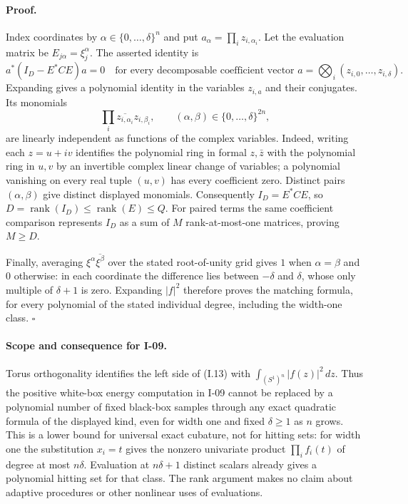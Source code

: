 \documentclass[11pt,a4paper]{article}
\theoremstyle{definition}\newtheorem{definition}{Definition}
\begin{document}
\paragraph{Proof.}
Index coordinates by $\alpha\in\{0,\ldots,\delta\}^n$ and put
$a_\alpha=\prod_i z_{i,\alpha_i}$.  Let the evaluation matrix be
$E_{j\alpha}=\xi_j^\alpha$.  The asserted identity is
\[
 a^*(I_D-E^*CE)a=0
\quad\text{for every decomposable coefficient vector }
a=\bigotimes_i(z_{i,0},\ldots,z_{i,\delta}).
\]
Expanding gives a polynomial identity in the variables
$z_{i,a}$ and their conjugates.  Its monomials
\[
 \prod_i\overline{z_{i,\alpha_i}}z_{i,\beta_i},
 \qquad (\alpha,\beta)\in\{0,\ldots,\delta\}^{2n},
\]
are linearly independent as functions of the complex variables.
Indeed, writing each $z=u+iv$ identifies the polynomial ring in
formal $z,\bar z$ with the polynomial ring in $u,v$ by an invertible
complex linear change of variables; a polynomial vanishing on every
real tuple $(u,v)$ has every coefficient zero.  Distinct pairs
$(\alpha,\beta)$ give distinct displayed monomials.  Consequently
$I_D=E^*CE$, so
$D=\operatorname{rank}(I_D)\le\operatorname{rank}(E)\le Q$.
For paired terms the same coefficient comparison represents $I_D$
as a sum of $M$ rank-at-most-one matrices, proving $M\ge D$.

Finally, averaging $\xi^\alpha\overline{\xi^\beta}$ over the stated
root-of-unity grid gives $1$ when $\alpha=\beta$ and $0$ otherwise:
in each coordinate the difference lies between $-\delta$ and
$\delta$, whose only multiple of $\delta+1$ is zero.  Expanding
$|f|^2$ therefore proves the matching formula, for every polynomial
of the stated individual degree, including the width-one class.
\hfill$\square$

\paragraph{Scope and consequence for I-09.}
Torus orthogonality identifies the left side of (I.13) with
$\int_{(S^1)^n}|f(z)|^2\,dz$.  Thus the positive white-box energy
computation in I-09 cannot be replaced by a polynomial number of
fixed black-box samples through any exact quadratic formula of the
displayed kind, even for width one and fixed $\delta\ge1$ as $n$ grows.
This is a lower bound for universal exact cubature, not for hitting
sets: for width one the substitution $x_i=t$ gives the nonzero
univariate product $\prod_i f_i(t)$ of degree at most $n\delta$.
Evaluation at $n\delta+1$ distinct scalars already gives a polynomial
hitting set for that class.  The rank argument makes no claim about
adaptive procedures or other nonlinear uses of evaluations.
\end{document}
